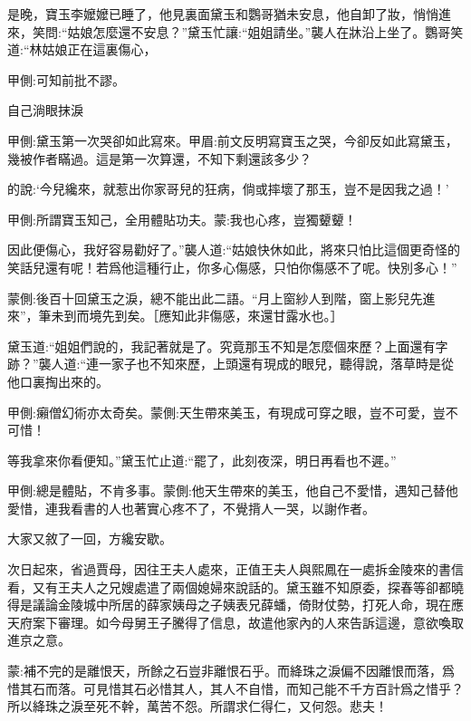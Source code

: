 \begin{parag}
    是晚，寶玉李嬤嬤已睡了，他見裏面黛玉和鸚哥猶未安息，他自卸了妝，悄悄進來，笑問:“姑娘怎麼還不安息？”黛玉忙讓:“姐姐請坐。”襲人在牀沿上坐了。鸚哥笑道:“林姑娘正在這裏傷心，\begin{note}甲側:可知前批不謬。\end{note}自己淌眼抹淚\begin{note}甲側:黛玉第一次哭卻如此寫來。甲眉:前文反明寫寶玉之哭，今卻反如此寫黛玉，幾被作者瞞過。這是第一次算還，不知下剩還該多少？\end{note}的說:‘今兒纔來，就惹出你家哥兒的狂病，倘或摔壞了那玉，豈不是因我之過！’\begin{note}甲側:所謂寶玉知己，全用體貼功夫。蒙:我也心疼，豈獨顰顰！\end{note}因此便傷心，我好容易勸好了。”襲人道:“姑娘快休如此，將來只怕比這個更奇怪的笑話兒還有呢！若爲他這種行止，你多心傷感，只怕你傷感不了呢。快別多心！”\begin{note}蒙側:後百十回黛玉之淚，總不能出此二語。“月上窗紗人到階，窗上影兒先進來”，筆未到而境先到矣。［應知此非傷感，來還甘露水也。］\end{note}黛玉道:“姐姐們說的，我記著就是了。究竟那玉不知是怎麼個來歷？上面還有字跡？”襲人道:“連一家子也不知來歷，上頭還有現成的眼兒，聽得說，落草時是從他口裏掏出來的。\begin{note}甲側:癩僧幻術亦太奇矣。蒙側:天生帶來美玉，有現成可穿之眼，豈不可愛，豈不可惜！\end{note}等我拿來你看便知。”黛玉忙止道:“罷了，此刻夜深，明日再看也不遲。”\begin{note}甲側:總是體貼，不肯多事。蒙側:他天生帶來的美玉，他自己不愛惜，遇知己替他愛惜，連我看書的人也著實心疼不了，不覺揹人一哭，以謝作者。\end{note}大家又敘了一回，方纔安歇。
\end{parag}


\begin{parag}
    次日起來，省過賈母，因往王夫人處來，正值王夫人與熙鳳在一處拆金陵來的書信看，又有王夫人之兄嫂處遣了兩個媳婦來說話的。黛玉雖不知原委，探春等卻都曉得是議論金陵城中所居的薛家姨母之子姨表兄薛蟠，倚財仗勢，打死人命，現在應天府案下審理。如今母舅王子騰得了信息，故遣他家內的人來告訴這邊，意欲喚取進京之意。
\end{parag}


\begin{parag}
    \begin{note}蒙:補不完的是離恨天，所餘之石豈非離恨石乎。而絳珠之淚偏不因離恨而落，爲惜其石而落。可見惜其石必惜其人，其人不自惜，而知己能不千方百計爲之惜乎？所以絳珠之淚至死不幹，萬苦不怨。所謂求仁得仁，又何怨。悲夫！\end{note}
\end{parag}